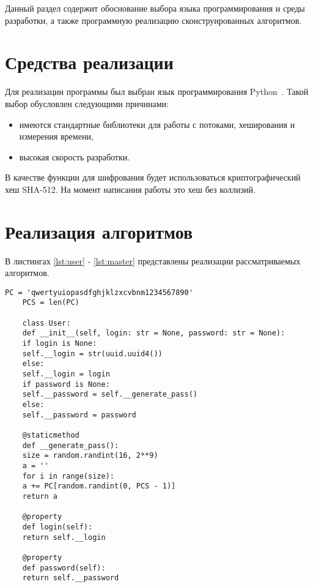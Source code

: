 \documentclass[../report.tex]{subfiles}
\begin{document}
Данный раздел содержит обоснование выбора языка программирования и среды разработки, а также программную реализацию сконструированных алгоритмов.

\section{Средства реализации}
Для реализации программы был выбран язык программирования Python~\cite{python}. Такой выбор обусловлен следующими причинами:
\begin{itemize}
	\item имеются стандартные библиотеки для работы с потоками, хеширования и измерения времени,
	\item высокая скорость разработки.
\end{itemize}

В качестве функции для шифрования будет использоваться криптографический хеш SHA-512. На момент написания работы это хеш без коллизий.

\section{Реализация алгоритмов}
В листингах \ref{lst:user} - \ref{lst:master} представлены реализации рассматриваемых алгоритмов.
\newpage

\begin{lstlisting}[caption=Класс User, label={lst:user}]
	PC = 'qwertyuiopasdfghjklzxcvbnm1234567890'
	PCS = len(PC)
	
	class User:
	def __init__(self, login: str = None, password: str = None):
	if login is None:
	self.__login = str(uuid.uuid4())
	else:
	self.__login = login
	if password is None:
	self.__password = self.__generate_pass()
	else:
	self.__password = password
	
	@staticmethod
	def __generate_pass():
	size = random.randint(16, 2**9)
	a = ''
	for i in range(size):
	a += PC[random.randint(0, PCS - 1)]
	return a
	
	@property
	def login(self):
	return self.__login
	
	@property
	def password(self):
	return self.__password
\end{lstlisting}
\end{document}
